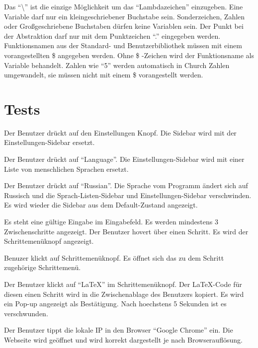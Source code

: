 \documentclass[parskip=full,11pt,twoside]{scrartcl}
\begin{document}
Das \enquote{\textbackslash} ist die einzige Möglichkeit um das \enquote{Lambdazeichen} einzugeben.
Eine Variable darf nur ein kleingeschriebener Buchstabe sein. Sonderzeichen, Zahlen oder Großgeschriebene Buchstaben dürfen keine Variablen sein.
Der Punkt bei der Abstraktion darf nur mit dem Punktzeichen \enquote{.} eingegeben werden.
Funktionsnamen aus der Standard- und Benutzerbibliothek müssen mit einem vorangestellten \$ angegeben werden. Ohne \$ -Zeichen wird der Funktionsname als Variable behandelt.
Zahlen wie \enquote{5} werden automatisch in Church Zahlen umgewandelt, sie müssen nicht mit einem \$ vorangestellt werden.

\newpage
\section{Tests}

{Der Benutzer drückt auf den Einstellungen Knopf.}
{Die Sidebar wird mit der Einstellungen-Sidebar ersetzt.}

{Der Benutzer drückt auf \enquote{Language}.}
{Die Einstellungen-Sidebar wird mit einer Liste von menschlichen Sprachen ersetzt.}

{Der Benutzer drückt auf \enquote{Russian}.}
{Die Sprache vom Programm ändert sich auf Russisch und die Sprach-Listen-Sidebar und
Einstellungen-Sidebar verschwinden. Es wird wieder die Sidebar aus dem Default-Zustand angezeigt.}

\teststep
{Es steht eine gültige Eingabe im Eingabefeld.
Es werden mindestens 3 Zwischenschritte angezeigt.}
{Der Benutzer hovert über einen Schritt.}
{Es wird der Schrittemenüknopf angezeigt.}

{Benuzer klickt auf Schrittemenüknopf.}
{Es öffnet sich das zu dem Schritt zugehörige Schrittemenü.}

{Der Benutzer klickt auf \enquote{LaTeX} im Schrittemenüknopf.}
{Der LaTeX-Code für diesen einen Schritt wird in die Zwischenablage des Benutzers kopiert.
Es wird ein Pop-up angezeigt als Bestätigung. Nach hoechstens 5 Sekunden ist es verschwunden.}

{Der Benutzer tippt die lokale IP in den Browser \enquote {Google Chrome} ein.}
{Die Webseite wird geöffnet und wird korrekt dargestellt je nach Browserauflösung.}
\end{document}
